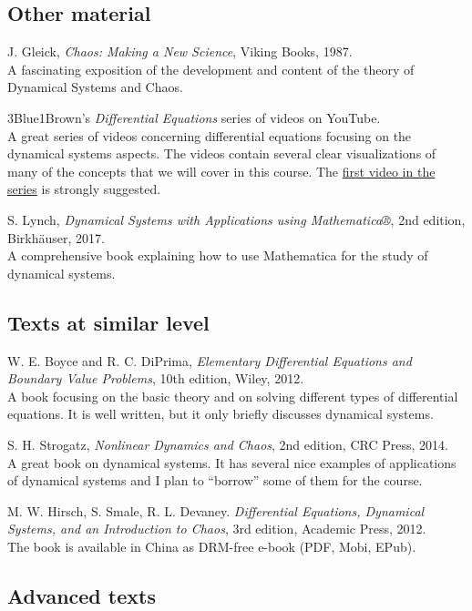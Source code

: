 \documentclass[11pt]{article}
\newcommand{\push}{\hangpara{2em}{1}}
\begin{document}
\subsection{Other material}

\push J. Gleick, \textit{Chaos: Making a New Science}, Viking Books, 1987. \\
A fascinating exposition of the development and content of the theory of Dynamical Systems and Chaos.

\push 3Blue1Brown’s \textit{Differential Equations} series of videos on YouTube. \\
A great series of videos concerning differential equations focusing on the dynamical systems aspects. The videos contain several clear visualizations of many of the concepts that we will cover in this course. The \href{https://www.youtube.com/watch?v=p_di4Zn4wz4}{first video in the series} is strongly suggested.

\push S. Lynch, \textit{Dynamical Systems with Applications using Mathematica®}, 2nd edition, Birkhäuser, 2017. \\
A comprehensive book explaining how to use Mathematica for the study of dynamical systems.

\subsection{Texts at similar level}

\push W. E. Boyce and R. C. DiPrima, \textit{Elementary Differential Equations and Boundary Value Problems}, 10th edition, Wiley, 2012. \\
A book focusing on the basic theory and on solving different types of differential equations. It is well written, but it only briefly discusses dynamical systems. 

\push S. H. Strogatz, \textit{Nonlinear Dynamics and Chaos}, 2nd edition, CRC Press, 2014. \\
A great book on dynamical systems. It has several nice examples of applications of dynamical systems and I plan to “borrow” some of them for the course.

\push M. W. Hirsch, S. Smale, R. L. Devaney. \textit{Differential Equations, Dynamical Systems, and an Introduction to Chaos}, 3rd edition, Academic Press, 2012. \\
The book is available in China as DRM-free e-book (PDF, Mobi, EPub). 


\subsection{Advanced texts}
\end{document}
